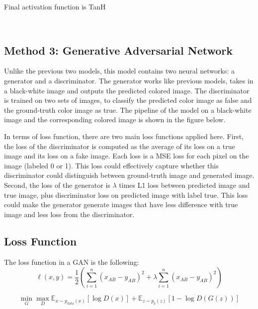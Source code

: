 \documentclass{article}
\begin{document}
Final activation function is TanH

\


\subsection{Method 3: Generative Adversarial Network}
Unlike the previous two models, this model contains two neural networks: a generator and a discriminator. 
The generator works like previous models, takes in a black-white image and outputs the predicted colored image.
The discriminator is trained on two sets of images, to classify the predicted color image as false and the ground-truth color image as true. 
The pipeline of the model on a black-white image and the corresponding colored image is shown in the figure below.

In terms of loss function, there are two main loss functions applied here. 
First, the loss of the discriminator is computed as the average of its loss on a true image and its loss on a fake image. 
Each loss is a MSE loss for each pixel on the image (labeled 0 or 1). 
This loss could effectively capture whether this discriminator could distinguish between ground-truth image and generated image.
Second, the loss of the generator is $\lambda$ times L1 loss between predicted image and true image, plus discriminator loss on predicted image with label true.
This loss could make the generator generate images that have less difference with true image and less loss from the discriminator.


\subsection{Loss Function}
The loss function in a GAN is the following:
{\Large
\begin{equation}
    \ell(x,y) = \frac{1}{2} \left( \sum_{i=1}^{n} \left( x_{AB} - y_{AB} \right)^2 + \lambda \sum_{i=1}^{n} \left( x_{AB} - y_{AB} \right)^2 \right)
\end{equation}
}

{\Large
\begin{equation}
\min_{G}\max_{D}\mathbb{E}_{x\sim p_{\text{data}}(x)}[\log{D(x)}] +  \mathbb{E}_{z\sim p_{\text{z}}(z)}[1 - \log{D(G(z))}]
\end{equation}
}
\end{document}

